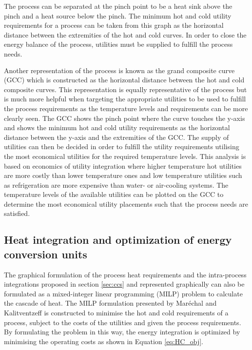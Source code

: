 The process can be separated at the pinch point to be a heat sink above the pinch and a heat source below the pinch. The minimum hot and cold utility requirements for a process can be taken from this graph as the horizontal distance between the extremities of the hot and cold curves. In order to close the energy balance of the process, utilities must be supplied to fulfill the process needs.

Another representation of the process is known as the grand composite curve (GCC) which is constructed as the horizontal distance between the hot and cold composite curves. This representation is equally representative of the process but is much more helpful when targeting the appropriate utilities to be used to fulfill the process requirements as the temperature levels and requirements can be more clearly seen. The GCC shows the pinch point where the curve touches the y-axis and shows the minimum hot and cold utility requirements as the horizontal distance between the y-axis and the extremities of the GCC. The supply of utilities can then be decided in order to fulfill the utility requirements utilising the most economical utilities for the required temperature levels. This analysis is based on economics of utility integration where higher temperature hot utilities are more costly than lower temperature ones and low temperature utilities such as refrigeration are more expensive than water- or air-cooling systems. The temperature levels of the available utilities can be plotted on the GCC to determine the most economical utility placements such that the process needs are satisfied.

\subsection{Heat integration and optimization of energy conversion units}\label{sec:cascade}

The graphical formulation of the process heat requirements and the intra-process integrations proposed in section \ref{sec:ccs} and represented graphically can also be formulated as a mixed-integer linear programming (MILP) problem to calculate the cascade of heat. The MILP formulation presented by Mar\'echal and Kalitventzeff \cite{Marechal_1998} is constructed to minimise the hot and cold requirements of a process, subject to the costs of the utilities and given the process requirements. By formulating the problem in this way, the energy integration is optimized by minimising the operating costs as shown in Equation \ref{eq:HC_obj}. 

